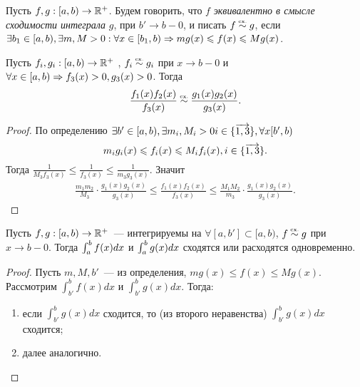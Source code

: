 \documentclass[../main.tex]{subfiles}
\begin{document}
    
    \begin{definition}
      Пусть $f,g : [a, b) \to \mathbb{R}^{+}$. Будем говорить, что $f$ \emph{эквивалентно в смысле сходимости интеграла} $g$, при $b' \to b-0$, и писать $f \eqincon g$, если $\exists b_1 \in [a, b), \exists m, M > 0 : \forall x \in [b_1, b) \Rightarrow m g(x) \leqslant f(x)  \leqslant M g(x) $.     
    \end{definition}

    \begin{lemma}
        Пусть $f_i, g_i: [a,b) \to \mathbb{R}^{+}$ , $ f_i \eqincon g_i$ при $x \to b-0$ и $\forall x \in [a, b) \Rightarrow f_3(x) > 0, g_3 (x) > 0$. Тогда 
        \begin{gather} 
          \frac{f_1 (x) f_2 (x)}{f_3 (x)} \eqincon \frac{g_1 (x) g_2 (x)}{g_3 (x)} .
        \end{gather}  
    \end{lemma}
    
    
    \begin{proof}
      По определению $\exists b' \in [a,b), \exists m_i, M_i > 0 {i \in\{\overrightarrow{1,3}\}}, \forall x[b',b) $ $$ m_i g_i(x) \leqslant f_i (x) \leqslant M_i f_i (x), {i \in\{\overrightarrow{1,3}\}} .$$
      Тогда $\frac{1}{M_3 f_3 (x)} \leq\frac{1}{f_3 (x)} \leq \frac{1}{m_3 g_3 (x)}$. Значит 
      \begin{gather} 
        \frac{m_1 m_2 }{M_3 } \cdot \frac{g_1 (x) g_2 (x)}{g_3 (x)} \leq \frac{f_1 (x) f_2 (x)}{f_3 (x)} \leq \frac{M_1 M_2 }{m_3 } \cdot  \frac{g_1 (x) g_2 (x)}{g_3 (x)} .
      \end{gather}
    \end{proof}
    
    
    \begin{proposition}
      Пусть $f, g: [a,b) \to \mathbb{R}^{+}$~--- интегрируемы на $\forall [a,b'] \subset [a,b)$, $f \eqincon g$ при $x \to b-0$.  Тогда $\int_a^b f(x) dx$ и $\int_a^b g(x) dx$ сходятся или расходятся одновременно.
    \end{proposition}
    
    
    \begin{proof}
      Пусть $m, M, b'$~--- из определения, $m g(x) \leq f(x) \leq M g(x) $. Рассмотрим $\int_{b'}^{b} f(x) dx $ и $\int_{b'}^{b} g(x) dx $. 
      Тогда:
        \begin{enumerate}
          \item если $\int_{b'}^{b} g(x)dx$ сходится, то (из второго неравенства) $\int_{b'}^{b} g(x) dx$ сходится;
          \item далее аналогично. 
      \end{enumerate}
    \end{proof}
    
\end{document}
